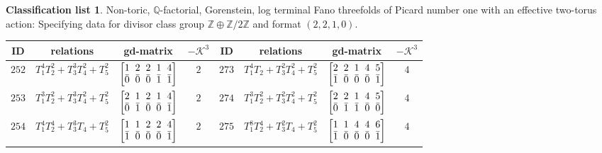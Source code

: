 \documentclass[10pt,a4paper]{amsart}
\theoremstyle{definition}
\newtheorem{class-list}[thm]{Classification list}
\def\ZZ{{\mathbb Z}}
\def\QQ{{\mathbb Q}}
\numberwithin{equation}{section}
\begin{document}
\begin{class-list}\label{class-list(0,2)}
Non-toric, $\QQ$-factorial, Gorenstein, log terminal Fano
threefolds of Picard number one with an effective two-torus action:
Specifying data for divisor class group $\ZZ \oplus \ZZ/2\ZZ$ and
format $(2,2,1,0)$.
\begin{table}[h!]\centering\setlength{\tabcolsep}{3.5pt}
\renewcommand{\arraystretch}{1.3}\small\tabulinesep=1mm
\begin{tabu}{c|c|c|c||c|c|c|c}
\hline
ID&relations&gd-matrix&$-\mathcal{K}^3$&ID&relations&gd-matrix&$-\mathcal{K}^3$
\\
\hline
${252}$&${T_{1}^{4}T_{2}^{2}+T_{3}^{3}T_{4}^{2}+T_{5}^{2}}$
&$\arraycolsep=1mm\begin{bmatrix}{1} & {2} & {2} & {1} & {4} \\ {\bar{0}} & {\bar{0}} & {\bar{0}} & {\bar{1}} & {\bar{1}}\end{bmatrix}$&${2}$
&${273}$&${T_{1}^{4}T_{2}+T_{3}^{2}T_{4}^{2}+T_{5}^{2}}$
&$\arraycolsep=1mm\begin{bmatrix}{2} & {2} & {1} & {4} & {5} \\ {\bar{1}} & {\bar{0}} & {\bar{0}} & {\bar{0}} & {\bar{1}}\end{bmatrix}$&${4}$
\\
\hline
${253}$&${T_{1}^{3}T_{2}^{2}+T_{3}^{3}T_{4}^{2}+T_{5}^{2}}$
&$\arraycolsep=1mm\begin{bmatrix}{2} & {1} & {2} & {1} & {4} \\ {\bar{0}} & {\bar{1}} & {\bar{0}} & {\bar{0}} & {\bar{1}}\end{bmatrix}$&${2}$
&${274}$&${T_{1}^{3}T_{2}^{2}+T_{3}^{2}T_{4}^{2}+T_{5}^{2}}$
&$\arraycolsep=1mm\begin{bmatrix}{2} & {2} & {1} & {4} & {5} \\ {\bar{0}} & {\bar{1}} & {\bar{1}} & {\bar{0}} & {\bar{0}}\end{bmatrix}$&${4}$
\\
\hline
${254}$&${T_{1}^{4}T_{2}^{4}+T_{3}^{3}T_{4}+T_{5}^{2}}$
&$\arraycolsep=1mm\begin{bmatrix}{1} & {1} & {2} & {2} & {4} \\ {\bar{1}} & {\bar{0}} & {\bar{0}} & {\bar{0}} & {\bar{1}}\end{bmatrix}$&${2}$
&${275}$&${T_{1}^{8}T_{2}^{4}+T_{3}^{2}T_{4}+T_{5}^{2}}$
&$\arraycolsep=1mm\begin{bmatrix}{1} & {1} & {4} & {4} & {6} \\ {\bar{1}} & {\bar{0}} & {\bar{0}} & {\bar{0}} & {\bar{1}}\end{bmatrix}$&${4}$

\end{tabu}
\end{table}
\end{class-list}
\end{document}
